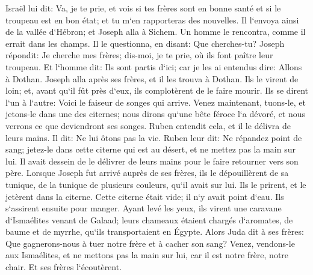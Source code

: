 \verse Israël lui dit: Va, je te prie, et vois si tes frères sont en bonne santé et si le troupeau est en bon état; et tu m`en rapporteras des nouvelles. Il l`envoya ainsi de la vallée d`Hébron; et Joseph alla à Sichem. 
\verse Un homme le rencontra, comme il errait dans les champs. Il le questionna, en disant: Que cherches-tu? 
\verse Joseph répondit: Je cherche mes frères; dis-moi, je te prie, où ils font paître leur troupeau. 
\verse Et l`homme dit: Ils sont partis d`ici; car je les ai entendus dire: Allons à Dothan. Joseph alla après ses frères, et il les trouva à Dothan. 
\verse Ils le virent de loin; et, avant qu`il fût près d`eux, ils complotèrent de le faire mourir. 
\verse Ils se dirent l`un à l`autre: Voici le faiseur de songes qui arrive. 
\verse Venez maintenant, tuons-le, et jetons-le dans une des citernes; nous dirons qu`une bête féroce l`a dévoré, et nous verrons ce que deviendront ses songes. 
\verse Ruben entendit cela, et il le délivra de leurs mains. Il dit: Ne lui ôtons pas la vie. 
\verse Ruben leur dit: Ne répandez point de sang; jetez-le dans cette citerne qui est au désert, et ne mettez pas la main sur lui. Il avait dessein de le délivrer de leurs mains pour le faire retourner vers son père. 
\verse Lorsque Joseph fut arrivé auprès de ses frères, ils le dépouillèrent de sa tunique, de la tunique de plusieurs couleurs, qu`il avait sur lui. 
\verse Ils le prirent, et le jetèrent dans la citerne. Cette citerne était vide; il n`y avait point d`eau. 
\verse Ils s`assirent ensuite pour manger. Ayant levé les yeux, ils virent une caravane d`Ismaélites venant de Galaad; leurs chameaux étaient chargés d`aromates, de baume et de myrrhe, qu`ils transportaient en Égypte. 
\verse Alors Juda dit à ses frères: Que gagnerons-nous à tuer notre frère et à cacher son sang? 
\verse Venez, vendons-le aux Ismaélites, et ne mettons pas la main sur lui, car il est notre frère, notre chair. Et ses frères l`écoutèrent. 
